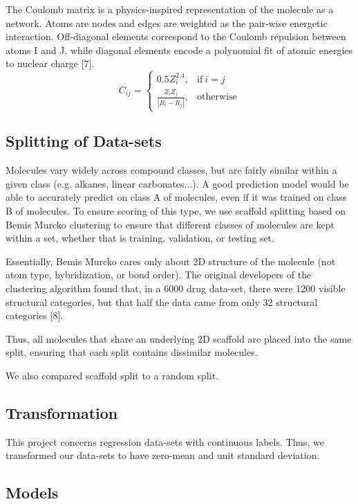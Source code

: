 \documentclass{article}
\begin{document}
The Coulomb matrix is a physics-inspired representation of the molecule as a network. Atoms are nodes and edges are weighted as the pair-wise energetic interaction. Off-diagonal elements correspond to the Coulomb repulsion between atoms I and J, while diagonal elements encode a polynomial fit of atomic energies to nuclear charge [7].
  \begin{equation}
    C_{ij}=
    \begin{cases}
      0.5 Z_i^{2.4}, & \text{if}\ i=j \\
      \frac{Z_i Z_j}{|R_i - R_j|}, & \text{otherwise}
    \end{cases}
  \end{equation}
 
\subsection{Splitting of Data-sets}

Molecules vary widely across compound classes, but are fairly similar within a given class (e.g. alkanes, linear carbonates...). A good prediction model would be able to accurately predict on class A of molecules, even if it was trained on class B of molecules. To ensure scoring of this type, we use scaffold splitting based on Bemis Murcko clustering to ensure that different classes of molecules are kept within a set, whether that is training, validation, or testing set. 

Essentially, Bemis Murcko cares only about 2D structure of the molecule (not atom type, hybridization, or bond order). The original developers of the clustering algorithm found that, in a 6000 drug data-set, there were 1200 visible structural categories, but that half the data came from only 32 structural categories [8].

Thus, all molecules that share an underlying 2D scaffold are placed into the same split, ensuring that each split contains dissimilar molecules.

We also compared scaffold split to a random split.

\subsection{Transformation}

This project concerns regression data-sets with continuous labels. Thus, we transformed our data-sets to have zero-mean and unit standard deviation.

\subsection{Models}
\end{document}
